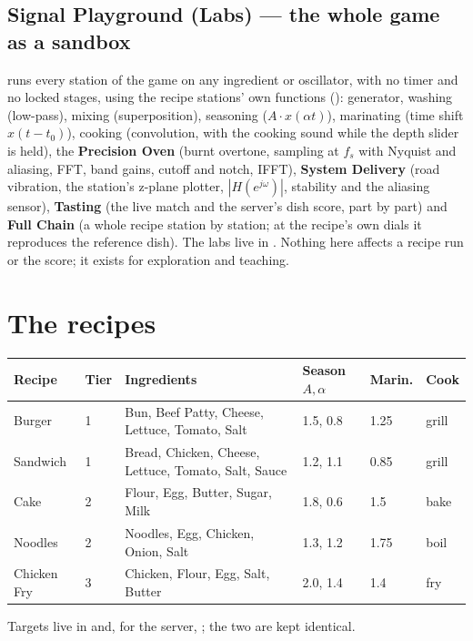 \documentclass[11pt,a4paper]{article}
\begin{document}
\subsection{Signal Playground (Labs) --- the whole game as a sandbox}
 runs every station of the game on any ingredient or
oscillator, with no timer and no locked stages, using the recipe stations' own functions
(): generator, washing (low-pass), mixing
(superposition), seasoning ($A\cdot x(\alpha t)$), marinating (time shift $x(t-t_0)$),
cooking (convolution, with the cooking sound while the depth slider is held), the
\textbf{Precision Oven} (burnt overtone, sampling at $f_s$ with Nyquist and aliasing, FFT,
band gains, cutoff and notch, IFFT), \textbf{System Delivery} (road vibration, the station's
z-plane plotter, $|H(e^{j\omega})|$, stability and the aliasing sensor), \textbf{Tasting}
(the live match and the server's dish score, part by part) and \textbf{Full Chain} (a whole
recipe station by station; at the recipe's own dials it reproduces the reference dish).
The labs live in . Nothing here affects a
recipe run or the score; it exists for exploration and teaching.

\section{The recipes}
{\small\setlength{\tabcolsep}{4pt}
\begin{longtable}{@{}P{2.3cm}P{0.7cm}P{6.4cm}P{1.9cm}P{1.3cm}P{1.2cm}@{}}
\toprule
Recipe & Tier & Ingredients & Season $A,\alpha$ & Marin. & Cook \\
\midrule
\endhead
Burger & 1 & Bun, Beef Patty, Cheese, Lettuce, Tomato, Salt & 1.5, 0.8 & 1.25 & grill \\
Sandwich & 1 & Bread, Chicken, Cheese, Lettuce, Tomato, Salt, Sauce & 1.2, 1.1 & 0.85 & grill \\
Cake & 2 & Flour, Egg, Butter, Sugar, Milk & 1.8, 0.6 & 1.5 & bake \\
Noodles & 2 & Noodles, Egg, Chicken, Onion, Salt & 1.3, 1.2 & 1.75 & boil \\
Chicken Fry & 3 & Chicken, Flour, Egg, Salt, Butter & 2.0, 1.4 & 1.4 & fry \\
\bottomrule
\end{longtable}}
Targets live in  and, for the server,
; the two are kept identical.
\end{document}
